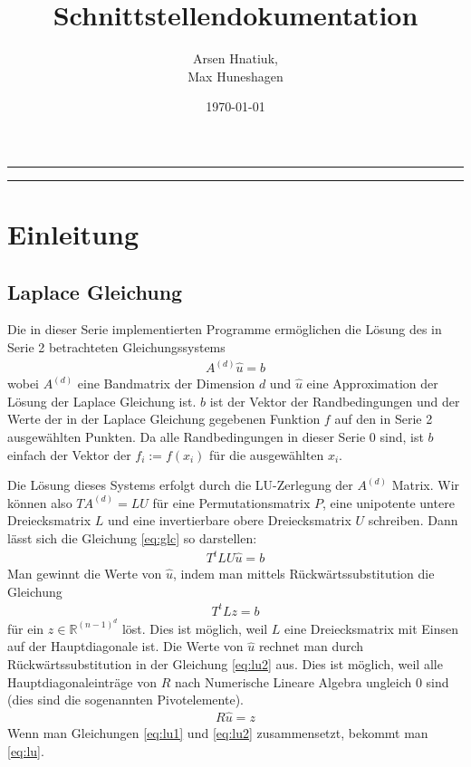 \documentclass[smallheadings]{scrartcl}
\title{Schnittstellendokumentation}
\author{%
  Arsen Hnatiuk,\\%
  Max Huneshagen 
}
\date{\today}
\numberwithin{equation}{section}
\begin{document}
\maketitle
\tableofcontents
\bigskip

\hrule
\hrule


\section{Einleitung}

\subsection{Laplace Gleichung}
Die in dieser Serie implementierten Programme ermöglichen die Lösung des in Serie 2 betrachteten Gleichungssystems
\begin{align}
A^{(d)}\hat{u} = b
\label{eq:glc}
\end{align}
wobei $A^{(d)}$ eine Bandmatrix der Dimension $d$ und $\hat{u}$ eine Approximation der Lösung der Laplace Gleichung ist. $b$ ist der Vektor der Randbedingungen und der Werte der in der Laplace Gleichung gegebenen Funktion $f$ auf den in Serie 2 ausgewählten Punkten. Da alle Randbedingungen in dieser Serie $0$ sind, ist $b$ einfach der Vektor der $f_i := f(x_i)$ für die ausgewählten $x_i$. 

Die Lösung dieses Systems erfolgt durch die LU-Zerlegung der $A^{(d)}$ Matrix. Wir können also $TA^{(d)}=LU$ für eine Permutationsmatrix $P$, eine unipotente untere Dreiecksmatrix $L$ und eine invertierbare obere Dreiecksmatrix $U$ schreiben. Dann lässt sich die Gleichung \ref{eq:glc} so darstellen:
\begin{align}
T^tLU\hat{u}=b
\label{eq:lu}
\end{align}
Man gewinnt die Werte von $\hat{u}$, indem man mittels Rückwärtssubstitution die Gleichung 
\begin{align}
T^tLz=b
\label{eq:lu1}
\end{align}
für ein $z\in \mathbb{R}^{(n-1)^d}$ löst. Dies ist möglich, weil $L$ eine Dreiecksmatrix mit Einsen auf der Hauptdiagonale ist. Die Werte von $\hat{u}$ rechnet man durch Rückwärtssubstitution in der Gleichung \ref{eq:lu2} aus. Dies ist möglich, weil alle Hauptdiagonaleinträge von $R$ nach Numerische Lineare Algebra ungleich $0$ sind (dies sind die sogenannten Pivotelemente).
\begin{align}
R\hat{u}=z
\label{eq:lu2}
\end{align}
Wenn man Gleichungen \ref{eq:lu1} und \ref{eq:lu2} zusammensetzt, bekommt man \ref{eq:lu}.
\end{document}
